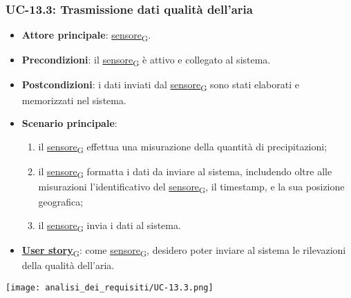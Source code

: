 \newpage

\subsubsection{UC-13.3: Trasmissione dati qualità dell'aria}
\begin{itemize}
	\item \textbf{Attore principale}: \href{https://7last.github.io/docs/rtb/documentazione-interna/glossario\#sensore}{sensore\textsubscript{G}}.
	\item \textbf{Precondizioni}: il \href{https://7last.github.io/docs/rtb/documentazione-interna/glossario\#sensore}{sensore\textsubscript{G}} è attivo e collegato al sistema.
	\item \textbf{Postcondizioni}: i dati inviati dal \href{https://7last.github.io/docs/rtb/documentazione-interna/glossario\#sensore}{sensore\textsubscript{G}} sono stati elaborati e memorizzati nel sistema.
	\item \textbf{Scenario principale}:
	      \begin{enumerate}
		      \item il \href{https://7last.github.io/docs/rtb/documentazione-interna/glossario\#sensore}{sensore\textsubscript{G}} effettua una misurazione della quantità di precipitazioni;
		      \item il \href{https://7last.github.io/docs/rtb/documentazione-interna/glossario\#sensore}{sensore\textsubscript{G}} formatta i dati da inviare al sistema, includendo oltre alle misurazioni l'identificativo del \href{https://7last.github.io/docs/rtb/documentazione-interna/glossario\#sensore}{sensore\textsubscript{G}},
		            il timestamp, e la sua posizione geografica;
		      \item il \href{https://7last.github.io/docs/rtb/documentazione-interna/glossario\#sensore}{sensore\textsubscript{G}} invia i dati al sistema.
	      \end{enumerate}
	\item \href{https://7last.github.io/docs/rtb/documentazione-interna/glossario\#user-story}{\textbf{User story}\textsubscript{G}}:
	      come \href{https://7last.github.io/docs/rtb/documentazione-interna/glossario\#sensore}{sensore\textsubscript{G}}, desidero poter inviare al sistema le rilevazioni della qualità dell'aria.
\end{itemize}

\begin{center}
	\texttt{[image: analisi\_dei\_requisiti/UC-13.3.png]}
\end{center}

